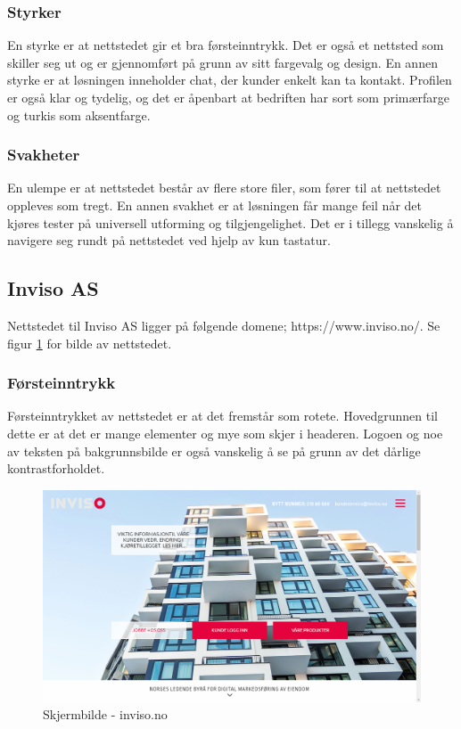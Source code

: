 \subsubsection{Styrker}
En styrke er at nettstedet gir et bra førsteinntrykk. Det er også et nettsted som skiller seg ut og er gjennomført på grunn av sitt fargevalg og design. En annen styrke er at løsningen inneholder chat, der kunder enkelt kan ta kontakt. Profilen er også klar og tydelig, og det er åpenbart at bedriften har sort som primærfarge og turkis som aksentfarge.

\subsubsection{Svakheter}
En ulempe er at nettstedet består av flere store filer, som fører til at nettstedet oppleves som tregt. En annen svakhet er at løsningen får mange feil når det kjøres tester på universell utforming og tilgjengelighet. Det er i tillegg vanskelig å navigere seg rundt på nettstedet ved hjelp av kun tastatur.

\subsection{Inviso AS}
Nettstedet til Inviso AS ligger på følgende domene;
https://www.inviso.no/. Se figur \ref{fig:competitors-inviso.no} for bilde av nettstedet.

\subsubsection{Førsteinntrykk}
Førsteinntrykket av nettstedet er at det fremstår som rotete. Hovedgrunnen til dette er at det er mange elementer og mye som skjer i headeren. Logoen og noe av teksten på bakgrunnsbilde er også vanskelig å se på grunn av det dårlige kontrastforholdet. 

\begin{figure}[H]
    \centering
    \includegraphics[width=\textwidth]{line/inviso_no_(1366x768).png}
    \caption{Skjermbilde - inviso.no}
    \label{fig:competitors-inviso.no}
\end{figure}

